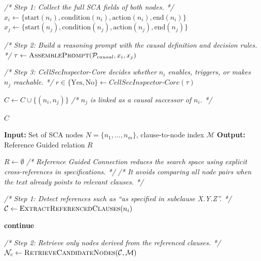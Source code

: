 \documentclass[sigconf]{acmart}
\newcommand{\core}{\textit{CellSecInspector-Core}\xspace}
\begin{document}
{\begin{algorithm}[ht]
\begin{algorithmic}[1]

    \State \textit{/* Step 1: Collect the full SCA fields of both nodes. */}
    \State $x_i \leftarrow \{\text{start}(n_i),\text{condition}(n_i),\text{action}(n_i),\text{end}(n_i)\}$
    \State $x_j \leftarrow \{\text{start}(n_j),\text{condition}(n_j),\text{action}(n_j),\text{end}(n_j)\}$

    \State \textit{/* Step 2: Build a reasoning prompt with the causal definition and decision rules. */}
    \State $\tau \leftarrow \textsc{AssemblePrompt}(\mathcal{P}_{causal}, x_i, x_j)$

    \State \textit{/* Step 3: \core decides whether $n_i$ enables, triggers, or makes $n_j$ reachable. */}
    \State $r \in \{\text{Yes},\text{No}\} \leftarrow \core(\tau)$

        \State $C \leftarrow C \cup \{(n_i,n_j)\}$
        \State \textit{/* $n_j$ is linked as a causal successor of $n_i$. */}
    \EndIf

\EndFor

\State \Return $C$

\end{algorithmic}
\end{algorithm}

\begin{algorithm}[ht]
\caption{Reference Guided Connection}
\label{alg:reference_connection}
\scriptsize
\begin{algorithmic}[1]

\State \textbf{Input:} Set of SCA nodes $N=\{n_1,\dots,n_m\}$, clause-to-node index $\mathcal{M}$
\State \textbf{Output:} Reference Guided relation $R$

\State $R \leftarrow \emptyset$
\State \textit{/* Reference Guided Connection reduces the search space using explicit cross-references in specifications. */}
\State \textit{/* It avoids comparing all node pairs when the text already points to relevant clauses. */}


    \State \textit{/* Step 1: Detect references such as ``as specified in subclause X.Y.Z''. */}
    \State $\mathcal{C} \leftarrow \textsc{ExtractReferencedClauses}(n_i)$

        \State \textbf{continue}
    \EndIf

    \State \textit{/* Step 2: Retrieve only nodes derived from the referenced clauses. */}
    \State $\mathcal{N}_c \leftarrow \textsc{RetrieveCandidateNodes}(\mathcal{C},\mathcal{M})$


\end{algorithmic}
\end{algorithm}}
\end{document}
